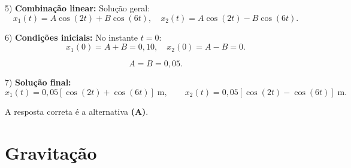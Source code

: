 \documentclass[a4paper,12pt]{article}
\begin{document}
\begin{flushleft}
5) \textbf{Combina\c{c}\~ao linear:}  
Solu\c{c}\~ao geral:
\[
x_1(t)=A\cos(2t)+B\cos(6t), \quad
x_2(t)=A\cos(2t)-B\cos(6t).
\]

6) \textbf{Condi\c{c}\~oes iniciais:}  
No instante $t=0$:
\[
x_1(0)=A+B=0,10, \quad x_2(0)=A-B=0.
\]

\[
A=B=0,05.
\]

7) \textbf{Solu\c{c}\~ao final:}
\[
x_1(t)=0,05[\cos(2t)+\cos(6t)] \;\text{m}, \qquad
x_2(t)=0,05[\cos(2t)-\cos(6t)] \;\text{m}.
\]

\medskip

A resposta correta \'e a alternativa \colorbox{green!50}{\textbf{(A)}}.

\end{flushleft}


\section{Gravita\c{c}\~ao}
\end{document}
